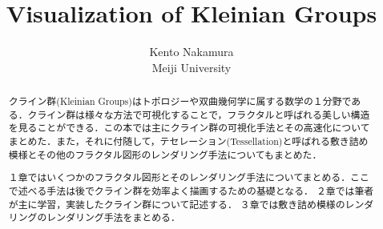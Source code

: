 \documentclass[dvipdfmx]{article}
\title{ Visualization of Kleinian Groups }
\author{ Kento Nakamura\\
Meiji University\\
}
\date{}
\begin{document}
\maketitle

\begin{abstract}
クライン群(Kleinian Groups)はトポロジーや双曲幾何学に属する数学の１分野である．クライン群は様々な方法で可視化することで，フラクタルと呼ばれる美しい構造を見ることができる．この本では主にクライン群の可視化手法とその高速化についてまとめた．また，それに付随して，テセレーション(Tessellation)と呼ばれる敷き詰め模様とその他のフラクタル図形のレンダリング手法についてもまとめた．

１章ではいくつかのフラクタル図形とそのレンダリング手法についてまとめる．ここで述べる手法は後でクライン群を効率よく描画するための基礎となる．
２章では筆者が主に学習，実装したクライン群について記述する．
３章では敷き詰め模様のレンダリングのレンダリング手法をまとめる．
\end{abstract}

\tableofcontents








\end{document}
